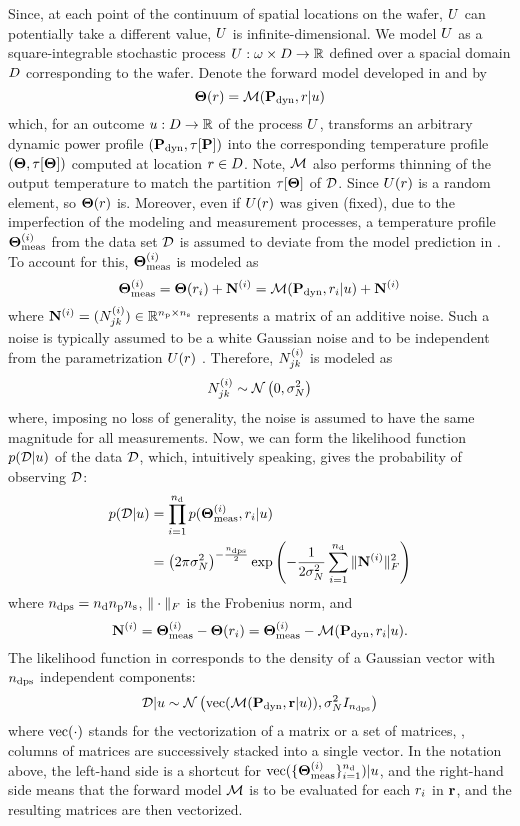 Since, at each point of the continuum of spatial locations on the wafer, $U$ can potentially take a different value, $U$ is infinite-dimensional. We model $U$ as a square-integrable stochastic process $U: \omega \times D \to \mathbb{R}$ defined over a spacial domain $D$ corresponding to the wafer. Denote the forward model developed in  and  by
\begin{equation} \elabel{model}
  \mT(\r) = \model{\mP_\dyn, \r | \u}
\end{equation}
which, for an outcome $u: D \to \mathbb{R}$ of the process $U$, transforms an arbitrary dynamic power profile $(\mathbf{P}_{\text{dyn}}, \tau[\mathbf{P}])$ into the corresponding temperature profile $\profileT$ computed at location $r \in D$. Note, $\model$ also performs thinning of the output temperature to match the partition $\tau[\boldsymbol{\Theta}]$ of $\mathcal{D}$. Since $U(r)$ is a random element, so $\boldsymbol{\Theta}(r)$ is. Moreover, even if $U(r)$ was given (fixed), due to the imperfection of the modeling and measurement processes, a temperature profile $\boldsymbol{\Theta}^{(i)}_{\text{meas}}$ from the data set $\mathcal{D}$ is assumed to deviate from the model prediction in . To account for this, $\boldsymbol{\Theta}^{(i)}_{\text{meas}}$ is modeled as
\[
  \mT^{(i)}_\meas = \mT(\r_i) + \mnoise^{(i)} = \model{\mP_\dyn, \r_i | \u} + \mnoise^{(i)}
\]
where $\mathbf{N}^{(i)} = (N^{(i)}_{jk}) \in \mathbb{R}^{{n_\text{p}} \times {n_\text{s}}}$ represents a matrix of an additive noise. Such a noise is typically assumed to be a white Gaussian noise and to be independent from the parametrization $U(r)$ \cite{marzouk2007, el-moselhy2012}. Therefore, $N^{(i)}_{jk}$ is modeled as
\[
  N^{(i)}_{jk} \sim \mathcal{N}\left(0, \sigma^2_N\right)
\]
where, imposing no loss of generality, the noise is assumed to have the same magnitude for all measurements. Now, we can form the likelihood function $\f{\data | \u}$ of the data $\mathcal{D}$, which, intuitively speaking, gives the probability of observing $\mathcal{D}$:
\begin{align}
  \f{\data | \u} & = \prod_{i = 1}^{\ndata} \f{\mT^{(i)}_\meas, \r_i | \u} \nonumber \\
  & = \left(2 \pi \sigma_\noise^2\right)^{-\frac{\ndcs}{2}} \exp\left( -\frac{1}{2 \sigma^2_\noise} \sum_{i = 1}^\ndata \fnorm{\mnoise^{(i)}}^2 \right) \elabel{likelihood}
\end{align}
where ${n_\text{dps}} = {n_\text{d}} {n_\text{p}} {n_\text{s}}$, $\| \cdot \|_F$ is the Frobenius norm, and
\[
  \mnoise^{(i)} = \mT^{(i)}_{\meas} - \mT(\r_i) = \mT^{(i)}_{\meas} - \model{\mP_\dyn, \r_i | \u}.
\]
The likelihood function in  corresponds to the density of a Gaussian vector with ${n_\text{dps}}$ independent components:
\[
  \data | \u \sim \gaussian{\vectorize{\model{\mP_\dyn, \vr | \u}}}{\sigma_\noise^2 \mI_\ndcs}
\]
where $\text{vec}(\cdot)$ stands for the vectorization of a matrix or a set of matrices, \ie, columns of matrices are successively stacked into a single vector. In the notation above, the left-hand side is a shortcut for $\text{vec}(\{ \boldsymbol{\Theta}_{\text{meas}}^{(i)} \}_{i = 1}^{n_\text{d}}) | u$, and the right-hand side means that the forward model $\model$ is to be evaluated for each $r_i$ in $\mathbf{r}$, and the resulting matrices are then vectorized.

